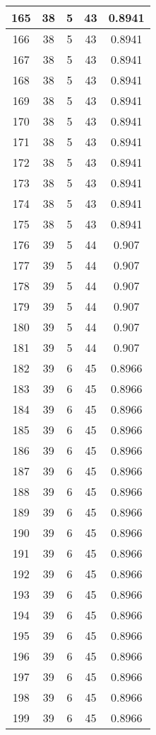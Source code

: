\documentclass[letterpaper, 12pt]{article}
\begin{document}
\begin{longtable}{|c|c|c|c|c|}
\hline
165 & 38 & 5 & 43 & 0.8941 \\
\hline
166 & 38 & 5 & 43 & 0.8941 \\
\hline
167 & 38 & 5 & 43 & 0.8941 \\
\hline
168 & 38 & 5 & 43 & 0.8941 \\
\hline
169 & 38 & 5 & 43 & 0.8941 \\
\hline
170 & 38 & 5 & 43 & 0.8941 \\
\hline
171 & 38 & 5 & 43 & 0.8941 \\
\hline
172 & 38 & 5 & 43 & 0.8941 \\
\hline
173 & 38 & 5 & 43 & 0.8941 \\
\hline
174 & 38 & 5 & 43 & 0.8941 \\
\hline
175 & 38 & 5 & 43 & 0.8941 \\
\hline
176 & 39 & 5 & 44 & 0.907 \\
\hline
177 & 39 & 5 & 44 & 0.907 \\
\hline
178 & 39 & 5 & 44 & 0.907 \\
\hline
179 & 39 & 5 & 44 & 0.907 \\
\hline
180 & 39 & 5 & 44 & 0.907 \\
\hline
181 & 39 & 5 & 44 & 0.907 \\
\hline
182 & 39 & 6 & 45 & 0.8966 \\
\hline
183 & 39 & 6 & 45 & 0.8966 \\
\hline
184 & 39 & 6 & 45 & 0.8966 \\
\hline
185 & 39 & 6 & 45 & 0.8966 \\
\hline
186 & 39 & 6 & 45 & 0.8966 \\
\hline
187 & 39 & 6 & 45 & 0.8966 \\
\hline
188 & 39 & 6 & 45 & 0.8966 \\
\hline
189 & 39 & 6 & 45 & 0.8966 \\
\hline
190 & 39 & 6 & 45 & 0.8966 \\
\hline
191 & 39 & 6 & 45 & 0.8966 \\
\hline
192 & 39 & 6 & 45 & 0.8966 \\
\hline
193 & 39 & 6 & 45 & 0.8966 \\
\hline
194 & 39 & 6 & 45 & 0.8966 \\
\hline
195 & 39 & 6 & 45 & 0.8966 \\
\hline
196 & 39 & 6 & 45 & 0.8966 \\
\hline
197 & 39 & 6 & 45 & 0.8966 \\
\hline
198 & 39 & 6 & 45 & 0.8966 \\
\hline
199 & 39 & 6 & 45 & 0.8966 \\
\hline
\end{longtable}
\end{document}
